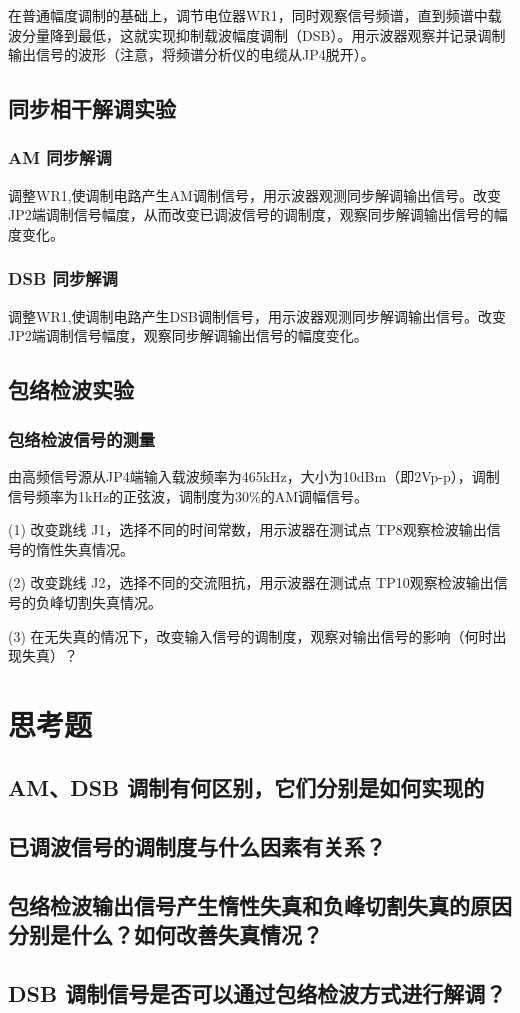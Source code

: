 \documentclass{../source/Experiment}
\begin{document}
            在普通幅度调制的基础上，调节电位器WR1，同时观察信号频谱，直到频谱中载波分量降到最低，这就实现抑制载波幅度调制（DSB）。用示波器观察并记录调制输出信号的波形（注意，将频谱分析仪的电缆从JP4脱开）。

        \subsection{同步相干解调实验}

        \subsubsection{AM 同步解调}

        调整WR1,使调制电路产生AM调制信号，用示波器观测同步解调输出信号。改变JP2端调制信号幅度，从而改变已调波信号的调制度，观察同步解调输出信号的幅度变化。

        \subsubsection{DSB 同步解调}
        
        调整WR1,使调制电路产生DSB调制信号，用示波器观测同步解调输出信号。改变JP2端调制信号幅度，观察同步解调输出信号的幅度变化。

        \subsection{包络检波实验}
        
        \subsubsection{包络检波信号的测量}
        
        由高频信号源从JP4端输入载波频率为465kHz，大小为10dBm（即2Vp-p），调制信号频率为1kHz的正弦波，调制度为30\%的AM调幅信号。

        (1) 改变跳线 J1，选择不同的时间常数，用示波器在测试点 TP8观察检波输出信号的惰性失真情况。

        (2) 改变跳线 J2，选择不同的交流阻抗，用示波器在测试点 TP10观察检波输出信号的负峰切割失真情况。

        (3) 在无失真的情况下，改变输入信号的调制度，观察对输出信号的影响（何时出现失真）？

    \section{思考题}
	    \subsection{AM、DSB 调制有何区别，它们分别是如何实现的}
        
        \subsection{已调波信号的调制度与什么因素有关系？}

        \subsection{包络检波输出信号产生惰性失真和负峰切割失真的原因分别是什么？如何改善失真情况？}
        
        \subsection{DSB 调制信号是否可以通过包络检波方式进行解调？
        }
	
\end{document}
